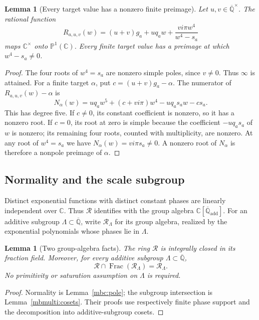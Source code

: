 \documentclass[11pt]{article}
\newtheorem{lemma}[theorem]{Lemma}
\theoremstyle{definition}
\theoremstyle{remark}
\newcommand{\Qa}{\overline{\mathbb Q}}
\begin{document}
\begin{lemma}[Every target value has a nonzero finite preimage]
\label{mre:surjectivity}
Let $u,v\in\Qa^\times$. The rational function
\begin{equation}\label{mre:rational-image}
 R_{a,u,v}(w)
 =(u+v)g_a+u q_aw+\frac{vi\pi w^4}{w^4-s_a}
\end{equation}
maps $\mathbb C^\times$ onto $\mathbb P^1(\mathbb C)$.
Every finite target value has a preimage at which
$w^4-s_a\ne0$.
\end{lemma}
\begin{proof}
The four roots of $w^4=s_a$ are nonzero simple poles, since $v\ne0$.
Thus $\infty$ is attained. For a finite target $\alpha$, put
$c=(u+v)g_a-\alpha$. The numerator of $R_{a,u,v}(w)-\alpha$ is
\[
 N_\alpha(w)
 =u q_aw^5+(c+vi\pi)w^4-u q_as_aw-cs_a.
\]
This has degree five. If $c\ne0$, its constant coefficient is nonzero,
so it has a nonzero root. If $c=0$, its root at zero is simple because
the coefficient $-u q_as_a$ of $w$ is nonzero; its remaining four roots,
counted with multiplicity, are nonzero. At any root of $w^4=s_a$ we have
$N_\alpha(w)=vi\pi s_a\ne0$. A nonzero root of $N_\alpha$ is therefore
a nonpole preimage of $\alpha$.
\end{proof}

\subsection{Normality and the scale subgroup}

Distinct exponential functions with distinct constant phases are
linearly independent over $\mathbb C$. Thus $\mathcal R$ identifies
with the group algebra $\mathbb C[\Qa_{\mathrm{add}}]$. For an additive
subgroup $\Lambda\subset\Qa$, write $\mathcal R_\Lambda$
for its group algebra, realized by the exponential polynomials whose
phases lie in $\Lambda$.

\begin{lemma}[Two group-algebra facts]\label{mre:group-ring}
The ring $\mathcal R$ is integrally closed in its fraction field.
Moreover, for every additive subgroup $\Lambda\subset\Qa$,
\begin{equation}\label{mre:intersection}
 \mathcal R\cap\operatorname{Frac}(\mathcal R_\Lambda)
 =\mathcal R_\Lambda.
\end{equation}
No primitivity or saturation assumption on $\Lambda$ is required.
\end{lemma}
\begin{proof}
Normality is Lemma~\ref{mbc:pole}; the subgroup intersection is
Lemma~\ref{mbmulti:cosets}.  Their proofs use respectively finite
phase support and the decomposition into additive-subgroup cosets.
\end{proof}
\end{document}
